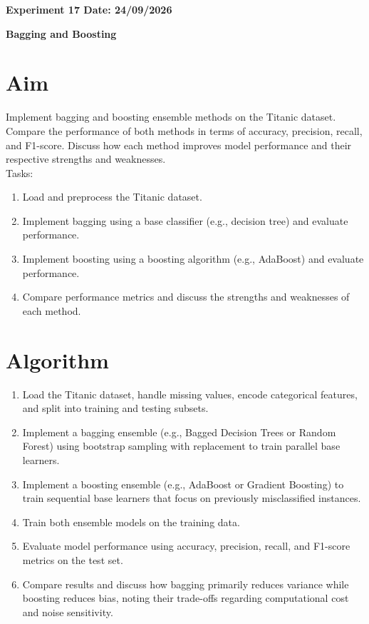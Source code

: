 \documentclass[12pt, a4paper]{report}
\begin{document}
\newpage 
\begin{center}
	\bfseries 
	Experiment 17 \hfill Date:  24/09/2026
\end{center}

\label{exp:17}
\begin{center}
	{\bfseries \Huge Bagging and Boosting}	
\end{center}

\section*{Aim} 
Implement bagging and boosting ensemble methods on the Titanic dataset. Compare the performance of both
methods in terms of accuracy, precision, recall, and F1-score. Discuss how each method improves model
performance and their respective strengths and weaknesses.\\
Tasks:
\begin{enumerate}[\quad -]
	\itemsep 0em 
	
	\item Load and preprocess the Titanic dataset.
	\item Implement bagging using a base classifier (e.g., decision tree) and evaluate performance.
	\item Implement boosting using a boosting algorithm (e.g., AdaBoost) and evaluate performance.
	\item Compare performance metrics and discuss the strengths and weaknesses of each method.
\end{enumerate}

\section*{Algorithm} 
\begin{enumerate}
	\item Load the Titanic dataset, handle missing values, encode categorical features, and split into training and testing subsets.
	\item Implement a bagging ensemble (e.g., Bagged Decision Trees or Random Forest) using bootstrap sampling with replacement to train parallel base learners.
	\item Implement a boosting ensemble (e.g., AdaBoost or Gradient Boosting) to train sequential base learners that focus on previously misclassified instances.
	\item Train both ensemble models on the training data.
	\item Evaluate model performance using accuracy, precision, recall, and F1-score metrics on the test set.
	\item Compare results and discuss how bagging primarily reduces variance while boosting reduces bias, noting their trade-offs regarding computational cost and noise sensitivity.
\end{enumerate}
\end{document}
